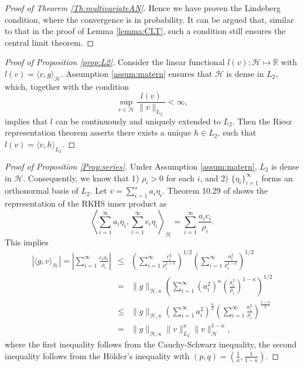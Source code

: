 \documentclass[12pt]{article}
\theoremstyle{plain}
\theoremstyle{remark}
\begin{document}
\begin{proof}[Proof of Theorem \ref{Th:multivariateAN}]
    Hence we have proven the Lindeberg condition, where the convergence is in probability. It can be argued that, similar to that in the proof of Lemma \ref{lemma:CLT}, such a condition still ensures the central limit theorem.
\end{proof}

\begin{proof}[Proof of Proposition \ref{prop:L2}]
    
 Consider the linear functional $l(v):\mathcal{H}\mapsto \mathbb{R}$ with $l(v)=\langle v,g\rangle_\mathcal{H}$. Assumption \ref{assum:matern} ensures that $\mathcal{H}$ is dense in $L_2$, which, together with the condition
 \[\sup_{v\in\mathcal{H}}\frac{l(v)}{\|v\|_{L_2}}<\infty,\]
 implies that $l$ can be continuously and uniquely extended to $L_2$. Then the Riesz representation theorem asserts there exists a unique $h\in L_2$, such that $l(v)=\langle v,h\rangle_{L_2}$.
\end{proof}


\begin{proof}[Proof of Proposition \ref{Prop:series}]
    Under Assumption \ref{assum:matern}, $L_2$ is dense in $\mathcal{H}$. Consequently, we know that 1) $\rho_i>0$ for each $i$, and 2) $\{\eta_i\}_{i=1}^\infty$ forms an orthonormal basis of $L_2$. Let $v=\sum_{i=1}^s a_i\eta_i$. Theorem 10.29 of \cite{wendland2004scattered} shows the representation of the RKHS inner product as
    \[\left\langle \sum_{i=1}^\infty a_i\eta_i,\sum_{i=1}^\infty c_i\eta_i\right\rangle_\mathcal{H}=\sum_{i=1}^\infty\frac{a_ic_i}{\rho_i}.\]
    This implies
    \begin{eqnarray*}
        |\langle g,v\rangle_\mathcal{H}|=\left|\sum_{i=1}^\infty\frac{c_ia_i}{\rho_i}\right| &\leq&\left(\sum_{i=1}^\infty \frac{c_i^2}{\rho^{1+\kappa}_i}\right)^{1/2}\left(\sum_{i=1}^\infty \frac{a_i^2}{\rho^{1-\kappa}_i}\right)^{1/2}\\
        &=&\|g\|_{\mathcal{H},\kappa}\left(\sum_{i=1}^\infty (a_i^2)^\kappa\left(\frac{a_i^2}{\rho_i}\right)^{1-\kappa}\right)^{1/2}\\
        &\leq&\|g\|_{\mathcal{H},\kappa}\left(\sum_{i=1}^\infty a_i^2\right)^{\frac{\kappa}{2}}\left(\sum_{i=1}^\infty \frac{a_i^2}{\rho_i}\right)^{\frac{1-\kappa}{2}}\\
        &=&\|g\|_{\mathcal{H},\kappa}\|v\|^{\kappa}_{L_2}\|v\|^{1-\kappa}_{\mathcal{H}},
    \end{eqnarray*}
    where the first inequality follows from the Cauchy-Schwarz inequality, the second inequality follows from the H\"older's inequality with $(p,q)=(\frac{1}{\kappa},\frac{1}{1-\kappa})$.
\end{proof}
\end{document}
